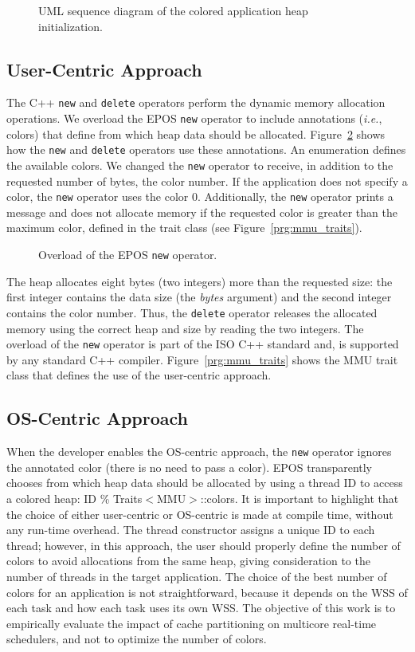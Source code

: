 \documentclass[10pt, conference, compsocconf]{IEEEtran}
\newcommand{\prg}[3][ht!]{
  \begin{figure}[#1]
      
    \caption{#3\label{prg:#2}}
  \end{figure}
}
\newcommand{\fig}[4][ht!]{
  \begin{figure}[#1]
    {\centering{\texttt{[image: fig/\#2]}}\par}
    \caption{#3}
    \label{fig:#2}
  \end{figure}
}
\begin{document}
\fig{uml_sequence_heap_init}{UML sequence diagram of the colored application heap initialization.}{scale=.45}

\subsection{User-Centric Approach}

The C++ \texttt{new} and \texttt{delete} operators perform the dynamic memory allocation operations. We overload the EPOS \texttt{new} operator to include annotations (\textit{i.e.}, colors) that define from which heap data should be allocated. Figure~\ref{prg:operator_new} shows how the \texttt{new} and \texttt{delete} operators use these annotations. An enumeration defines the available colors. We changed the \texttt{new} operator to receive, in addition to the requested number of bytes, the color number. If the application does not specify a color, the \texttt{new} operator uses the color 0. Additionally, the \texttt{new} operator prints a message and does not allocate memory if the requested color is greater than the maximum color, defined in the trait class (see Figure~\ref{prg:mmu_traits}).

\prg{operator_new}{Overload of the EPOS \texttt{new} operator.}

The heap allocates eight bytes (two integers) more than the requested size: the first integer contains the data size (the \textit{bytes} argument) and the second integer contains the color number. Thus, the \texttt{delete} operator releases the allocated memory using the correct heap and size by reading the two integers. The overload of the \texttt{new} operator is part of the ISO C++ standard and, is supported by any standard C++ compiler. Figure~\ref{prg:mmu_traits} shows the MMU trait class that defines the use of the user-centric approach.

\subsection{OS-Centric Approach}

When the developer enables the OS-centric approach, the \texttt{new} operator ignores the annotated color (there is no need to pass a color). EPOS transparently chooses from which heap data should be allocated by using a thread ID to access a colored heap: ID \% Traits$<$MMU$>$::colors. It is important to highlight that the choice of either user-centric or OS-centric is made at compile time, without any run-time overhead. The thread constructor assigns a unique ID to each thread; however, in this approach, the user should properly define the number of colors to avoid allocations from the same heap, giving consideration to the number of threads in the target application. The choice of the best number of colors for an application is not straightforward, because it depends on the WSS of each task and how each task uses its own WSS. The objective of this work is to empirically evaluate the impact of cache partitioning on multicore real-time schedulers, and not to optimize the number of colors.
\end{document}
